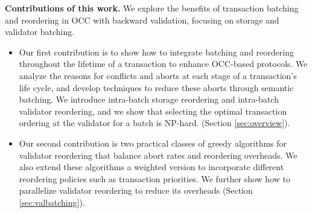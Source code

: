 {\bf Contributions of this work.}
We explore the benefits of transaction batching and reordering in OCC with backward validation, focusing on storage and validator batching. 
\begin{itemize}[leftmargin=*, nolistsep]
\item Our first contribution is to show how to integrate batching and reordering throughout the lifetime of a transaction to enhance OCC-based protocols. We analyze the reasons for conflicts and aborts at each stage of a transaction's life cycle, and develop techniques to reduce these aborts through semantic batching.
We introduce intra-batch storage reordering and
intra-batch validator reordering, and we show that selecting the
optimal transaction ordering at the validator for a batch is NP-hard.
(Section \ref{sec:overview}).
\item  Our second contribution is 
two practical classes of greedy algorithms for validator reordering 
that balance abort rates and reordering overheads.
We also extend these algorithms a weighted version to
incorporate different reordering policies such as transaction priorities. We further show how to parallelize validator reordering to reduce its overheads  (Section \ref{sec:valbatching}).



\end{itemize}
